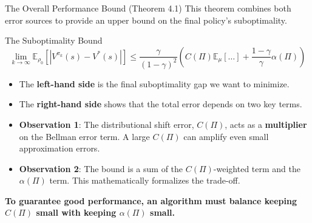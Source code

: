 \documentclass[11pt]{beamer}
\newcommand{\mbb}[1]{\mathbb{#1}}
\newcommand{\tb}[1]{\textbf{#1}}
\begin{document}
\begin{frame}{The Overall Performance Bound (Theorem 4.1)}
    This theorem combines both error sources to provide an upper bound on the final policy's suboptimality.

    \begin{block}{The Suboptimality Bound}
        \[
        \lim_{k \to \infty} \mbb{E}_{\rho_0}[|V^{\pi_k}(s) - V^*(s)|] \le \frac{\gamma}{(1-\gamma)^2} \left( C(\Pi) \mbb{E}_{\mu} [\dots] + \frac{1-\gamma}{\gamma} \alpha(\Pi) \right)
        \]
    \end{block}
    
    \begin{itemize}
        \item The \tb{left-hand side} is the final suboptimality gap we want to minimize.
        \item The \tb{right-hand side} shows that the total error depends on two key terms.
        \item \tb{Observation 1}: The distributional shift error, $C(\Pi)$, acts as a \tb{multiplier} on the Bellman error term. A large $C(\Pi)$ can amplify even small approximation errors.
        \item \tb{Observation 2}: The bound is a sum of the $C(\Pi)$-weighted term and the $\alpha(\Pi)$ term. This mathematically formalizes the trade-off.
    \end{itemize}

    \begin{center}
        \tb{To guarantee good performance, an algorithm must balance keeping $C(\Pi)$ small with keeping $\alpha(\Pi)$ small.}
    \end{center}
\end{frame}
\end{document}
